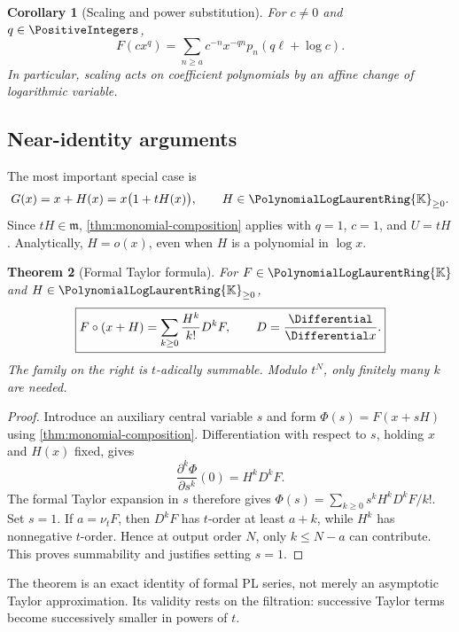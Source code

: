 \documentclass[11pt,oneside]{article}
\numberwithin{equation}{section}
\newtheorem{theorem}{Theorem}[section]
\newtheorem{corollary}[theorem]{Corollary}
\theoremstyle{definition}
\newcommand{\K}{\mathbb{K}}
\newcommand{\PL}{\PolynomialLogLaurentRing{\K}}
\newcommand{\ordx}{\nu_t}
\begin{document}
\begin{corollary}[Scaling and power substitution]
For \(c\ne0\) and \(q\in\PositiveIntegers\),
\begin{equation}\label{eq:scale-composition}
  F(cx^q)=\sum_{n\ge a}c^{-n}x^{-qn}
             p_n(q\ell+\log c).
\end{equation}
In particular, scaling acts on coefficient polynomials by an affine change of
logarithmic variable.
\end{corollary}

\subsection{Near-identity arguments}

The most important special case is
\begin{equation}\label{eq:near-identity-G}
  G(x)=x+H(x)=x\bigl(1+tH(x)\bigr),
  \qquad H\in{\PL}_{\ge0}.
\end{equation}
Since \(tH\in\mathfrak m\), \cref{thm:monomial-composition} applies with
\(q=1\), \(c=1\), and \(U=tH\).  Analytically, \(H=o(x)\), even when
\(H\) is a polynomial in \(\log x\).

\begin{theorem}[Formal Taylor formula]\label{thm:formal-taylor}
For \(F\in\PL\) and \(H\in{\PL}_{\ge0}\),
\begin{equation}\label{eq:formal-taylor}
\boxed{
  F\circ(x+H)=\sum_{k\ge0}\frac{H^k}{k!}D^kF,
  \qquad D=\frac{\Differential}{\Differential x}.
}
\end{equation}
The family on the right is \(t\)-adically summable.  Modulo \(t^N\), only
finitely many \(k\) are needed.
\end{theorem}

\begin{proof}
Introduce an auxiliary central variable \(s\) and form
\(\Phi(s)=F(x+sH)\) using \cref{thm:monomial-composition}.  Differentiation with
respect to \(s\), holding \(x\) and \(H(x)\) fixed, gives
\[
  \frac{\partial^k\Phi}{\partial s^k}(0)=H^kD^kF.
\]
The formal Taylor expansion in \(s\) therefore gives
\(\Phi(s)=\sum_{k\ge0}s^kH^kD^kF/k!\).  Set \(s=1\).  If
\(a=\ordx F\), then \(D^kF\) has \(t\)-order at least \(a+k\), while
\(H^k\) has nonnegative \(t\)-order.  Hence at output order \(N\), only
\(k\le N-a\) can contribute.  This proves summability and justifies setting
\(s=1\).
\end{proof}

The theorem is an exact identity of formal PL series, not merely an asymptotic
Taylor approximation.  Its validity rests on the filtration: successive Taylor
terms become successively smaller in powers of \(t\).
\end{document}
